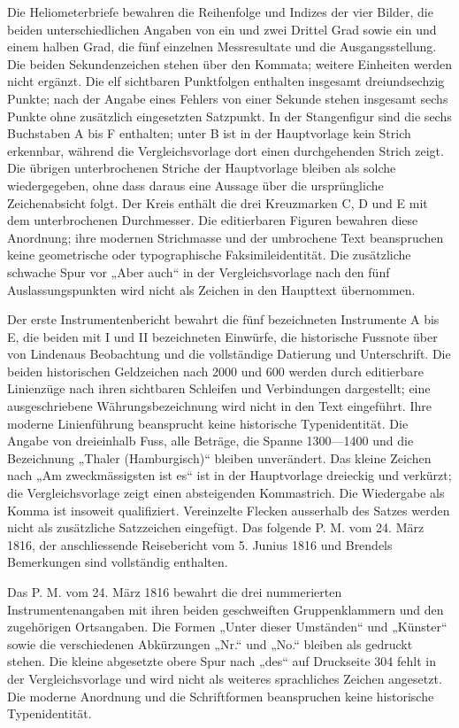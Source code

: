 Die Heliometerbriefe bewahren die Reihenfolge und Indizes der vier Bilder, die beiden unterschiedlichen Angaben von ein und zwei Drittel Grad sowie ein und einem halben Grad, die fünf einzelnen Messresultate und die Ausgangsstellung. Die beiden Sekundenzeichen stehen über den Kommata; weitere Einheiten werden nicht ergänzt. Die elf sichtbaren Punktfolgen enthalten insgesamt dreiundsechzig Punkte; nach der Angabe eines Fehlers von einer Sekunde stehen insgesamt sechs Punkte ohne zusätzlich eingesetzten Satzpunkt. In der Stangenfigur sind die sechs Buchstaben A bis F enthalten; unter B ist in der Hauptvorlage kein Strich erkennbar, während die Vergleichsvorlage dort einen durchgehenden Strich zeigt. Die übrigen unterbrochenen Striche der Hauptvorlage bleiben als solche wiedergegeben, ohne dass daraus eine Aussage über die ursprüngliche Zeichenabsicht folgt. Der Kreis enthält die drei Kreuzmarken C, D und E mit dem unterbrochenen Durchmesser. Die editierbaren Figuren bewahren diese Anordnung; ihre modernen Strichmasse und der umbrochene Text beanspruchen keine geometrische oder typographische Faksimileidentität. Die zusätzliche schwache Spur vor „Aber auch“ in der Vergleichsvorlage nach den fünf Auslassungspunkten wird nicht als Zeichen in den Haupttext übernommen.

Der erste Instrumentenbericht bewahrt die fünf bezeichneten Instrumente A bis E, die beiden mit I und II bezeichneten Einwürfe, die historische Fussnote über von Lindenaus Beobachtung und die vollständige Datierung und Unterschrift. Die beiden historischen Geldzeichen nach 2000 und 600 werden durch editierbare Linienzüge nach ihren sichtbaren Schleifen und Verbindungen dargestellt; eine ausgeschriebene Währungsbezeichnung wird nicht in den Text eingeführt. Ihre moderne Linienführung beansprucht keine historische Typenidentität. Die Angabe von dreieinhalb Fuss, alle Beträge, die Spanne 1300—1400 und die Bezeichnung „Thaler (Hamburgisch)“ bleiben unverändert. Das kleine Zeichen nach „Am zweckmässigsten ist es“ ist in der Hauptvorlage dreieckig und verkürzt; die Vergleichsvorlage zeigt einen absteigenden Kommastrich. Die Wiedergabe als Komma ist insoweit qualifiziert. Vereinzelte Flecken ausserhalb des Satzes werden nicht als zusätzliche Satzzeichen eingefügt. Das folgende P. M. vom 24. März 1816, der anschliessende Reisebericht vom 5. Junius 1816 und Brendels Bemerkungen sind vollständig enthalten.

Das P. M. vom 24. März 1816 bewahrt die drei nummerierten Instrumentenangaben mit ihren beiden geschweiften Gruppenklammern und den zugehörigen Ortsangaben. Die Formen „Unter dieser Umständen“ und „Künster“ sowie die verschiedenen Abkürzungen „Nr.“ und „No.“ bleiben als gedruckt stehen. Die kleine abgesetzte obere Spur nach „des“ auf Druckseite 304 fehlt in der Vergleichsvorlage und wird nicht als weiteres sprachliches Zeichen angesetzt. Die moderne Anordnung und die Schriftformen beanspruchen keine historische Typenidentität.

